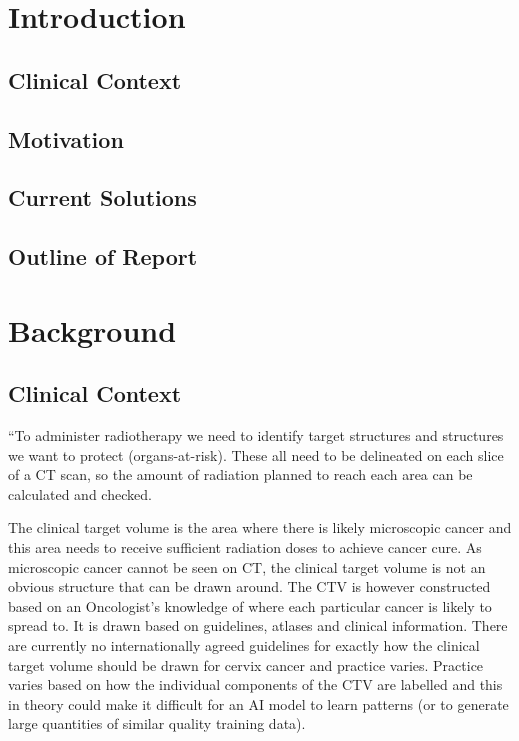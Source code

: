 \documentclass[11pt,twoside]{report}
\begin{document}
\chapter{Introduction} \label{sect:intro}

\section{Clinical Context} \label{sect:clinical-context-summary}

\section{Motivation}\label{sect:motivation}
% 

\section{Current Solutions}\label{sect:current-solutions}
% 

\section{Outline of Report}\label{sect:outline-of-report}

\chapter{Background}\label{sect:background}

\section{Clinical Context}\label{sect:clinical-context}

``To administer radiotherapy we need to identify target structures and structures we want to protect (organs-at-risk). These all need to be delineated on each slice of a CT scan, so the amount of radiation planned to reach each area can be calculated and checked.

The clinical target volume is the area where there is likely microscopic cancer and this area needs to receive sufficient radiation doses to achieve cancer cure. As microscopic cancer cannot be seen on CT, the clinical target volume is not an obvious structure that can be drawn around. The CTV is however constructed based on an Oncologist's knowledge of where each particular cancer is likely to spread to. It is drawn based on guidelines, atlases and clinical information. There are currently no internationally agreed guidelines for exactly how the clinical target volume should be drawn for cervix cancer and practice varies. Practice varies based on how the individual components of the CTV are labelled and this in theory could make it difficult for an AI model to learn patterns (or to generate large quantities of similar quality training data).
\end{document}
